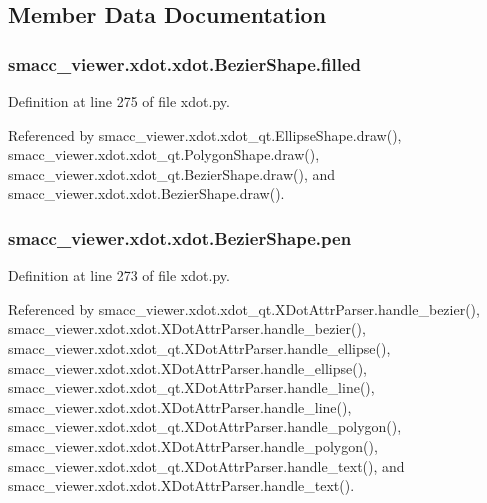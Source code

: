 \subsection{Member Data Documentation}
\subsubsection[{\texorpdfstring{filled}{filled}}]{\setlength{\rightskip}{0pt plus 5cm}smacc\+\_\+viewer.\+xdot.\+xdot.\+Bezier\+Shape.\+filled}\hypertarget{classsmacc__viewer_1_1xdot_1_1xdot_1_1BezierShape_a5beff7e4ce0bb454545896ed8fee7d4d}{}\label{classsmacc__viewer_1_1xdot_1_1xdot_1_1BezierShape_a5beff7e4ce0bb454545896ed8fee7d4d}


Definition at line 275 of file xdot.\+py.



Referenced by smacc\+\_\+viewer.\+xdot.\+xdot\+\_\+qt.\+Ellipse\+Shape.\+draw(), smacc\+\_\+viewer.\+xdot.\+xdot\+\_\+qt.\+Polygon\+Shape.\+draw(), smacc\+\_\+viewer.\+xdot.\+xdot\+\_\+qt.\+Bezier\+Shape.\+draw(), and smacc\+\_\+viewer.\+xdot.\+xdot.\+Bezier\+Shape.\+draw().

\subsubsection[{\texorpdfstring{pen}{pen}}]{\setlength{\rightskip}{0pt plus 5cm}smacc\+\_\+viewer.\+xdot.\+xdot.\+Bezier\+Shape.\+pen}\hypertarget{classsmacc__viewer_1_1xdot_1_1xdot_1_1BezierShape_acc54e94be731a399f2dc9fd91c0a1ead}{}\label{classsmacc__viewer_1_1xdot_1_1xdot_1_1BezierShape_acc54e94be731a399f2dc9fd91c0a1ead}


Definition at line 273 of file xdot.\+py.



Referenced by smacc\+\_\+viewer.\+xdot.\+xdot\+\_\+qt.\+X\+Dot\+Attr\+Parser.\+handle\+\_\+bezier(), smacc\+\_\+viewer.\+xdot.\+xdot.\+X\+Dot\+Attr\+Parser.\+handle\+\_\+bezier(), smacc\+\_\+viewer.\+xdot.\+xdot\+\_\+qt.\+X\+Dot\+Attr\+Parser.\+handle\+\_\+ellipse(), smacc\+\_\+viewer.\+xdot.\+xdot.\+X\+Dot\+Attr\+Parser.\+handle\+\_\+ellipse(), smacc\+\_\+viewer.\+xdot.\+xdot\+\_\+qt.\+X\+Dot\+Attr\+Parser.\+handle\+\_\+line(), smacc\+\_\+viewer.\+xdot.\+xdot.\+X\+Dot\+Attr\+Parser.\+handle\+\_\+line(), smacc\+\_\+viewer.\+xdot.\+xdot\+\_\+qt.\+X\+Dot\+Attr\+Parser.\+handle\+\_\+polygon(), smacc\+\_\+viewer.\+xdot.\+xdot.\+X\+Dot\+Attr\+Parser.\+handle\+\_\+polygon(), smacc\+\_\+viewer.\+xdot.\+xdot\+\_\+qt.\+X\+Dot\+Attr\+Parser.\+handle\+\_\+text(), and smacc\+\_\+viewer.\+xdot.\+xdot.\+X\+Dot\+Attr\+Parser.\+handle\+\_\+text().

